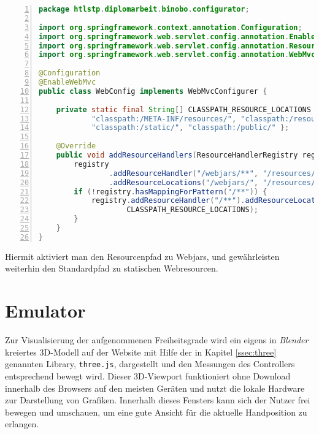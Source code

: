 \documentclass[paper=a4,12pt]{scrreprt}
\begin{document}
\begin{lstlisting}[caption={WebMvcConfigurer - Implementierung}, captionpos=b, label={listing:webmvc}, language=java, numbers=left,
  stepnumber=1]
package htlstp.diplomarbeit.binobo.configurator;

import org.springframework.context.annotation.Configuration;
import org.springframework.web.servlet.config.annotation.EnableWebMvc;
import org.springframework.web.servlet.config.annotation.ResourceHandlerRegistry;
import org.springframework.web.servlet.config.annotation.WebMvcConfigurer;

@Configuration
@EnableWebMvc
public class WebConfig implements WebMvcConfigurer {

    private static final String[] CLASSPATH_RESOURCE_LOCATIONS = {
            "classpath:/META-INF/resources/", "classpath:/resources/",
            "classpath:/static/", "classpath:/public/" };

    @Override
    public void addResourceHandlers(ResourceHandlerRegistry registry) {
        registry
                .addResourceHandler("/webjars/**", "/resources/**")
                .addResourceLocations("/webjars/", "/resources/");
        if (!registry.hasMappingForPattern("/**")) {
            registry.addResourceHandler("/**").addResourceLocations(
                    CLASSPATH_RESOURCE_LOCATIONS);
        }
    }
}
\end{lstlisting}

Hiermit aktiviert man den Resourcenpfad zu Webjars, und gewährleisten weiterhin den Standardpfad zu statischen Webresourcen.\newline

\section{Emulator}%
\label{sec:emu}

Zur Visualisierung der aufgenommenen Freiheitsgrade wird ein eigens in \textit{Blender} kreiertes 3D-Modell
auf der Website mit Hilfe der in Kapitel \ref{ssec:three} genannten Library,
\texttt{three.js}, dargestellt und den Messungen des Controllers entsprechend bewegt wird.
Dieser 3D-Viewport funktioniert ohne Download innerhalb des Browsers auf den meisten Geräten und
nutzt die lokale Hardware zur Darstellung von Grafiken.
Innerhalb dieses Fensters kann sich der Nutzer frei bewegen und umschauen, um eine gute
Ansicht für die aktuelle Handposition zu erlangen.
\end{document}
